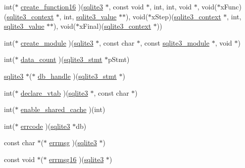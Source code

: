 \begin{DoxyCompactItemize}
int($\ast$ \hyperlink{structsqlite3__api__routines_a2cb97ce7512759a08f1744e24cd0294f}{create\+\_\+function16} )(\hyperlink{sqlite3_8h_a0ef6f2646262c8a9b24368d8ac140f69}{sqlite3} $\ast$, const void $\ast$, int, int, void $\ast$, void($\ast$x\+Func)(\hyperlink{sqlite3_8h_a3b519553ffec8fc42b2356f5b1ebdc57}{sqlite3\+\_\+context} $\ast$, int, \hyperlink{sqlite3_8h_ac2fa1ecdb2290d9af6010edbd1cbc83c}{sqlite3\+\_\+value} $\ast$$\ast$), void($\ast$x\+Step)(\hyperlink{sqlite3_8h_a3b519553ffec8fc42b2356f5b1ebdc57}{sqlite3\+\_\+context} $\ast$, int, \hyperlink{sqlite3_8h_ac2fa1ecdb2290d9af6010edbd1cbc83c}{sqlite3\+\_\+value} $\ast$$\ast$), void($\ast$x\+Final)(\hyperlink{sqlite3_8h_a3b519553ffec8fc42b2356f5b1ebdc57}{sqlite3\+\_\+context} $\ast$))
\item 
int($\ast$ \hyperlink{structsqlite3__api__routines_a0d2bee02b4c2ce95aa3ae6d4b904bff6}{create\+\_\+module} )(\hyperlink{sqlite3_8h_a0ef6f2646262c8a9b24368d8ac140f69}{sqlite3} $\ast$, const char $\ast$, const \hyperlink{structsqlite3__module}{sqlite3\+\_\+module} $\ast$, void $\ast$)
\item 
int($\ast$ \hyperlink{structsqlite3__api__routines_a4d248c8b990dc7b96c5734ec878508a0}{data\+\_\+count} )(\hyperlink{sqlite3_8h_af2a033da1327cdd77f0a174a09aedd0c}{sqlite3\+\_\+stmt} $\ast$p\+Stmt)
\item 
\hyperlink{sqlite3_8h_a0ef6f2646262c8a9b24368d8ac140f69}{sqlite3} $\ast$($\ast$ \hyperlink{structsqlite3__api__routines_a202912ed0777c34ef98ab262204d0c6e}{db\+\_\+handle} )(\hyperlink{sqlite3_8h_af2a033da1327cdd77f0a174a09aedd0c}{sqlite3\+\_\+stmt} $\ast$)
\item 
int($\ast$ \hyperlink{structsqlite3__api__routines_abe47369f89df1193ca28751e8d024818}{declare\+\_\+vtab} )(\hyperlink{sqlite3_8h_a0ef6f2646262c8a9b24368d8ac140f69}{sqlite3} $\ast$, const char $\ast$)
\item 
int($\ast$ \hyperlink{structsqlite3__api__routines_ae67da9e0a3629fd1fd46fd73389d8c98}{enable\+\_\+shared\+\_\+cache} )(int)
\item 
int($\ast$ \hyperlink{structsqlite3__api__routines_a1a985d959eafe6f293e41a5ca1d1a2e9}{errcode} )(\hyperlink{sqlite3_8h_a0ef6f2646262c8a9b24368d8ac140f69}{sqlite3} $\ast$db)
\item 
const char $\ast$($\ast$ \hyperlink{structsqlite3__api__routines_a69002673143895d276850a400e7955d7}{errmsg} )(\hyperlink{sqlite3_8h_a0ef6f2646262c8a9b24368d8ac140f69}{sqlite3} $\ast$)
\item 
const void $\ast$($\ast$ \hyperlink{structsqlite3__api__routines_a1392e153c69f5b32fd8acc19cb780baf}{errmsg16} )(\hyperlink{sqlite3_8h_a0ef6f2646262c8a9b24368d8ac140f69}{sqlite3} $\ast$)

\end{DoxyCompactItemize}
